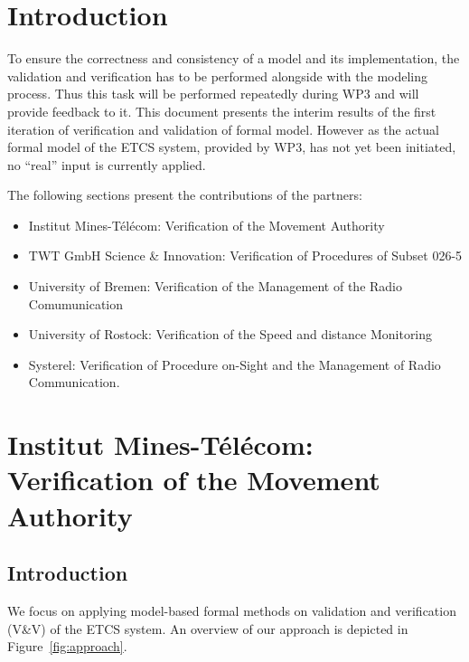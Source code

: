 \documentclass{template/openetcs_article}
\begin{document}



\section{Introduction}

To ensure the correctness and consistency of a model and its implementation, the
validation and verification has to be performed alongside with the modeling
process. Thus this task will be performed repeatedly during WP3 and will provide
feedback to it.
This document presents the interim results of the first iteration of
verification and validation of formal model.
However as the actual formal model of the ETCS system, provided by WP3, has not
yet been initiated, no ``real'' input is currently applied.

The following sections present the contributions of the partners: 
\begin{itemize}
  \item Institut Mines-Télécom: Verification of the Movement Authority
  \item TWT GmbH Science \& Innovation: Verification of Procedures of Subset
  026-5
  \item University of Bremen: Verification of the Management of the Radio
  Comumunication
  \item University of Rostock: Verification of the Speed and distance
  Monitoring  
  \item Systerel: Verification of Procedure on-Sight and the Management of Radio Communication.
\end{itemize}

\newpage
\section{Institut Mines-Télécom: Verification of the Movement Authority}

\subsection{Introduction}

We focus on applying model-based formal methods on validation and verification
(V\&V) of the ETCS system.
An overview of our approach is depicted in Figure~\ref{fig:approach}.
\end{document}
